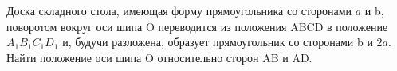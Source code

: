 Доска складного стола, имеющая форму прямоугольника со сторонами  $a$ и b,
поворотом вокруг оси шипа O переводится из положения ABCD в положение
$A_{1}B_{1}C_{1}D_{1}$ и, будучи разложена, образует прямоугольник со
сторонами b и $2a$. Найти положение оси шипа O относительно сторон AB и AD.
